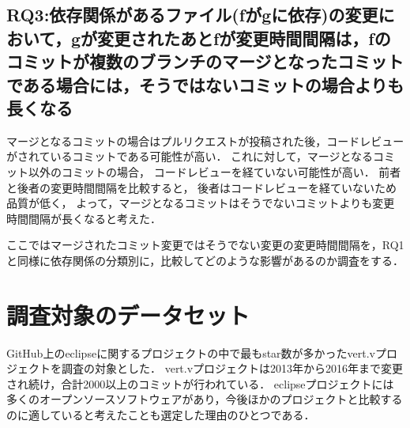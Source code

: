 \documentclass{fose2016}           %
\begin{document}
\subsection{RQ3:依存関係があるファイル(fがgに依存)の変更において，gが変更されたあとfが変更時間間隔は，fのコミットが複数のブランチのマージとなったコミットである場合には，そうではないコミットの場合よりも長くなる}
マージとなるコミットの場合はプルリクエストが投稿された後，コードレビューがされているコミットである可能性が高い．
これに対して，マージとなるコミット以外のコミットの場合， コードレビューを経ていない可能性が高い．
前者と後者の変更時間間隔を比較すると， 後者はコードレビューを経ていないため品質が低く，
よって，マージとなるコミットはそうでないコミットよりも変更時間間隔が長くなると考えた．

ここではマージされたコミット変更ではそうでない変更の変更時間間隔を，RQ1と同様に依存関係の分類別に，比較してどのような影響があるのか調査をする．

\section{調査対象のデータセット}\label{調査対象のデータセット}
GitHub上のeclipseに関するプロジェクトの中で最もstar数が多かったvert.vプロジェクトを調査の対象とした．
vert.vプロジェクトは2013年から2016年まで変更され続け，合計2000以上のコミットが行われている．
eclipseプロジェクトには多くのオープンソースソフトウェアがあり，今後ほかのプロジェクトと比較するのに適していると考えたことも選定した理由のひとつである．
\end{document}
